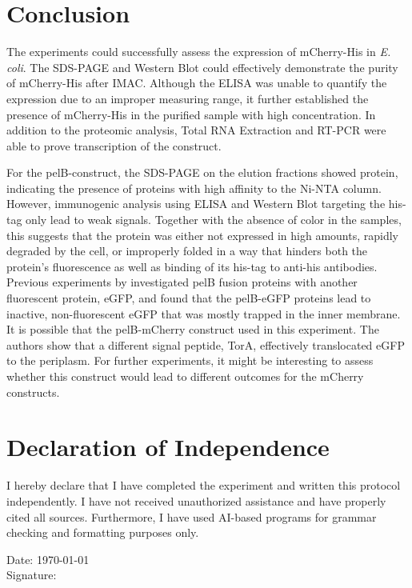 \documentclass[a4paper,12pt]{article}
\begin{document}
\section{Conclusion}
The experiments could successfully assess the expression of mCherry-His in \emph{E. coli}. The SDS-PAGE and Western Blot could effectively demonstrate the purity of mCherry-His after IMAC. Although the ELISA was unable to quantify the expression due to an improper measuring range, it further established the presence of mCherry-His in the purified sample with high concentration. In addition to the proteomic analysis, Total RNA Extraction and RT-PCR were able to prove transcription of the construct. 

For the pelB-construct, the SDS-PAGE on the elution fractions showed protein, indicating the presence of proteins with high affinity to the Ni-NTA column. However, immunogenic analysis using ELISA and Western Blot targeting the his-tag only lead to weak signals. Together with the absence of color in the samples, this suggests that the protein was either not expressed in high amounts, rapidly degraded by the cell, or improperly folded in a way that hinders both the protein's fluorescence as well as binding of its his-tag to anti-his antibodies. Previous experiments by \cite{linton2012translocation} investigated pelB fusion proteins with another fluorescent protein, eGFP, and found that the pelB-eGFP proteins lead to inactive, non-fluorescent eGFP that was mostly trapped in the inner membrane. It is possible that the pelB-mCherry construct used in this experiment. The authors show that a different signal peptide, TorA, effectively translocated eGFP to the periplasm. For further experiments, it might be interesting to assess whether this construct would lead to different outcomes for the mCherry constructs.


\printbibliography


\newpage
\section*{Declaration of Independence}
I hereby declare that I have completed the experiment and written this protocol independently. I have not received unauthorized assistance and have properly cited all sources. Furthermore, I have used AI-based programs for grammar checking and formatting purposes only.

Date: \today \\
Signature: \underline{\hspace{5cm}}
\end{document}
